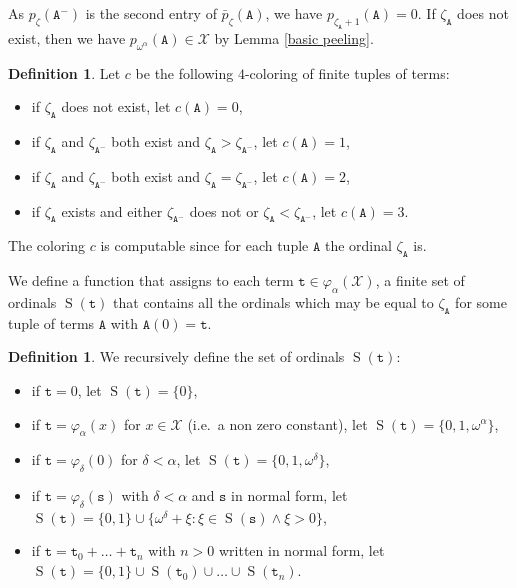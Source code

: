 \documentclass[11pt]{amsart}
\theoremstyle{definition}
\newtheorem{definition}[thm]{Definition}
\theoremstyle{remark}
\theoremstyle{plain}
\renewcommand{\S}{\operatorname{S}}
\def\X{\mathcal{X}}
\def\om{\omega}
\def\a{\alpha}
\def\d{\delta}
\def\z{\zeta}
\def\pbar{\bar{p}}
\begin{document}
As $p_\z(\mathtt{A}^-)$ is the second entry of $\pbar_\z(\mathtt{A})$, we have $p_{\z_\mathtt{A} + 1} (\mathtt{A}) = 0$.
If $\z_\mathtt{A}$ does not exist, then we have $p_{\om^\a} (\mathtt{A}) \in \X$ by Lemma \ref{basic peeling}.
		
\begin{definition}\label{def: coloring on ord}
Let $c$ be the following $4$-coloring of finite tuples of terms:
\begin{itemize}
	\item if $\z_\mathtt{A}$ does not exist, let $c(\mathtt{A}) = 0$,
	\item if $\z_\mathtt{A}$ and $\z_{\mathtt{A}^-}$ both exist and $\z_\mathtt{A} > \z_{\mathtt{A}^-}$, let $c(\mathtt{A}) = 1$,
	\item if $\z_\mathtt{A}$ and $\z_{\mathtt{A}^-}$ both exist and $\z_\mathtt{A}=\z_{\mathtt{A}^-}$, let $c(\mathtt{A}) = 2$,
	\item if $\z_\mathtt{A}$ exists and either $\z_{\mathtt{A}^-}$ does not or $\z_\mathtt{A} < \z_{\mathtt{A}^-}$, let $c(\mathtt{A}) = 3$.
\end{itemize}
\end{definition}

The coloring $c$ is computable since for each tuple $\mathtt{A}$ the ordinal $\z_\mathtt{A}$ is.

We define a function that assigns to each term $\mathtt{t} \in \varphi_\a(\X)$, a finite set of ordinals $\S(\mathtt{t})$ that contains all the ordinals which may be equal to $\z_\mathtt{A}$ for some tuple of terms $\mathtt{A}$ with $\mathtt{A}(0) = \mathtt{t}$.
		
\begin{definition}
We recursively define the set of ordinals $\S(\mathtt{t})$:
\begin{itemize}
	\item if $\mathtt{t}=0$, let $\S(\mathtt{t}) = \{0\}$,
    \item if $\mathtt{t}=\varphi_\a(x)$ for $x \in \X$ (i.e.\ a non zero constant), let $\S(\mathtt{t}) = \{0,1,\om^\a\}$,
    \item if $\mathtt{t} = \varphi_\d (0)$ for $\d < \a$, let $\S(\mathtt{t}) = \{0, 1, \om^\d\}$,
	\item if $\mathtt{t} = \varphi_\d (\mathtt{s})$ with $\d < \a$ and $\mathtt{s}$ in normal form, let $\S(\mathtt{t}) = \{0, 1\} \cup \{\om^\d + \xi: \xi \in \S(\mathtt{s}) \wedge \xi > 0\}$,
	\item if $\mathtt{t} = \mathtt{t}_0 + \ldots + \mathtt{t}_n$ with $n > 0$ written in normal form, let $\S(\mathtt{t}) = \{0,1\} \cup \S(\mathtt{t}_0) \cup \ldots \cup \S(\mathtt{t}_n)$.
\end{itemize}
\end{definition}
\end{document}

